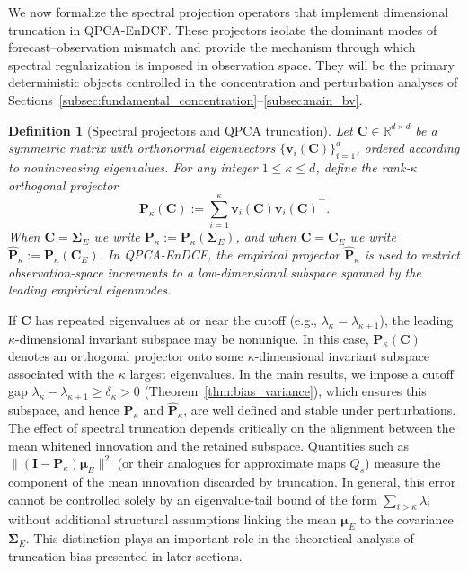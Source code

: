 \documentclass[11pt,a4paper]{article}
\newtheorem{definition}{Definition}
\begin{document}
We now formalize the spectral projection operators that implement dimensional truncation in QPCA-EnDCF. These projectors isolate the dominant modes of forecast--observation mismatch and provide the mechanism through which spectral regularization is imposed in observation space. They will be the primary deterministic objects controlled in the concentration and perturbation analyses of Sections~\ref{subsec:fundamental_concentration}--\ref{subsec:main_bv}.

\begin{definition}[Spectral projectors and QPCA truncation]
\label{def:projectors_truncation}
Let $\mathbf{C}\in\mathbb{R}^{d\times d}$ be a symmetric matrix with orthonormal eigenvectors $\{\mathbf{v}_i(\mathbf{C})\}_{i=1}^{d}$, ordered according to nonincreasing eigenvalues. For any integer $1\le\kappa\le d$, define the rank-$\kappa$ orthogonal projector
\begin{equation}
\mathbf{P}_\kappa(\mathbf{C})
:=
\sum_{i=1}^{\kappa}\mathbf{v}_i(\mathbf{C})\mathbf{v}_i(\mathbf{C})^\top.
\end{equation}
When $\mathbf{C}=\boldsymbol{\Sigma}_E$ we write $\mathbf{P}_\kappa:=\mathbf{P}_\kappa(\boldsymbol{\Sigma}_E)$, and when $\mathbf{C}=\mathbf{C}_E$ we write $\hat{\mathbf{P}}_\kappa:=\mathbf{P}_\kappa(\mathbf{C}_E)$. In QPCA-EnDCF, the empirical projector $\hat{\mathbf{P}}_\kappa$ is used to restrict observation-space increments to a low-dimensional subspace spanned by the leading empirical eigenmodes.
\end{definition}
If $\mathbf{C}$ has repeated eigenvalues at or near the cutoff (e.g., $\lambda_\kappa=\lambda_{\kappa+1}$), the leading $\kappa$-dimensional invariant subspace may be nonunique. In this case, $\mathbf{P}_\kappa(\mathbf{C})$ denotes an orthogonal projector onto some $\kappa$-dimensional invariant subspace associated with the $\kappa$ largest eigenvalues. In the main results, we impose a cutoff gap $\lambda_\kappa-\lambda_{\kappa+1}\ge \delta_\kappa>0$ (Theorem~\ref{thm:bias_variance}), which ensures this subspace, and hence $\mathbf{P}_\kappa$ and $\hat{\mathbf{P}}_\kappa$, are well defined and stable under perturbations.
The effect of spectral truncation depends critically on the alignment between the mean whitened innovation and the retained subspace. Quantities such as $\|(\mathbf{I}-\mathbf{P}_\kappa)\boldsymbol{\mu}_E\|^2$ (or their analogues for approximate maps $Q_s$) measure the component of the mean innovation discarded by truncation. In general, this error cannot be controlled solely by an eigenvalue-tail bound of the form $\sum_{i>\kappa}\lambda_i$ without additional structural assumptions linking the mean $\boldsymbol{\mu}_E$ to the covariance $\boldsymbol{\Sigma}_E$. This distinction plays an important role in the theoretical analysis of truncation bias presented in later sections.
\end{document}

